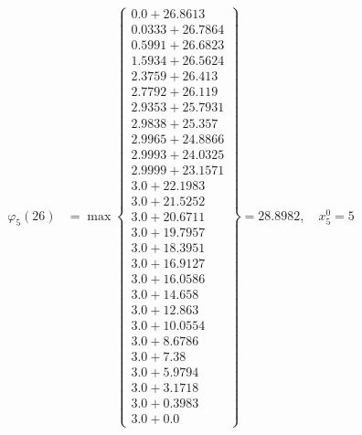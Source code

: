\documentclass{article}
\begin{document}
\begin{align*}
  
\varphi_{5}(26) &= \max \left\{ \begin{array}{c}
0.0 + 26.8613 \\
 0.0333 + 26.7864 \\
 0.5991 + 26.6823 \\
 1.5934 + 26.5624 \\
 2.3759 + 26.413 \\
 2.7792 + 26.119 \\
 2.9353 + 25.7931 \\
 2.9838 + 25.357 \\
 2.9965 + 24.8866 \\
 2.9993 + 24.0325 \\
 2.9999 + 23.1571 \\
 3.0 + 22.1983 \\
 3.0 + 21.5252 \\
 3.0 + 20.6711 \\
 3.0 + 19.7957 \\
 3.0 + 18.3951 \\
 3.0 + 16.9127 \\
 3.0 + 16.0586 \\
 3.0 + 14.658 \\
 3.0 + 12.863 \\
 3.0 + 10.0554 \\
 3.0 + 8.6786 \\
 3.0 + 7.38 \\
 3.0 + 5.9794 \\
 3.0 + 3.1718 \\
 3.0 + 0.3983 \\
 3.0 + 0.0
\end{array} \right\}=28.8982,\quad x_{5}^0=5\\
  
  
  

\end{align*}
\end{document}
